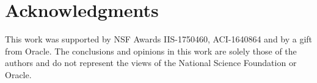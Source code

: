 \documentclass{vldb}
\begin{document}
\section{Acknowledgments}
This work was supported by NSF Awards IIS-1750460, ACI-1640864
and by a gift from Oracle. The conclusions and opinions in this
work are solely those of the authors and do not represent the views
of the National Science Foundation or Oracle.




\end{document}
